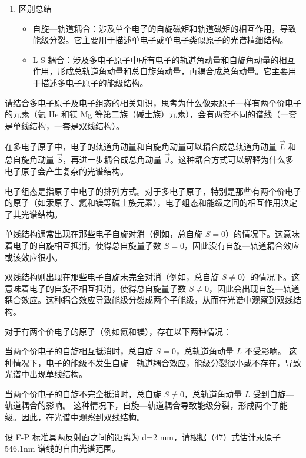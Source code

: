 \documentclass[dvipsnames, svgnames,a4paper,11pt]{article}
\begin{document}
\begin{enumerate}
		\item 区别总结
		
		\begin{itemize}
			\item 自旋—轨道耦合：涉及单个电子的自旋磁矩和轨道磁矩的相互作用，导致能级分裂。它主要用于描述单电子或单电子类似原子的光谱精细结构。
			\item L-S 耦合：涉及多电子原子中所有电子的轨道角动量和自旋角动量的相互作用，形成总轨道角动量和总自旋角动量，再耦合成总角动量。它主要用于描述多电子原子的能级结构。
		\end{itemize}
	\end{enumerate}
	
	
	\begin{question}
		请结合多电子原子及电子组态的相关知识，思考为什么像汞原子一样有两个价电子的元素（氦 He 和镁 Mg 等第二族（碱土族）元素），会有两套不同的谱线（一套是单线结构，一套是双线结构）。
	\end{question}
	
	在多电子原子中，电子的轨道角动量和自旋角动量可以耦合成总轨道角动量 \( \vec{L} \) 和总自旋角动量 \( \vec{S} \)，再进一步耦合成总角动量 \( \vec{J} \)。这种耦合方式可以解释为什么多电子原子会产生复杂的光谱结构。
	
	电子组态是指原子中电子的排列方式。对于多电子原子，特别是那些有两个价电子的原子（如汞原子、氦和镁等碱土族元素），电子组态和能级之间的相互作用决定了其光谱结构。
	
	单线结构通常出现在那些电子自旋对消（例如，总自旋 \( S = 0 \)）的情况下。这意味着电子的自旋相互抵消，使得总自旋量子数 \( S = 0 \)，因此没有自旋—轨道耦合效应或该效应很小。
	
	双线结构则出现在那些电子自旋未完全对消（例如，总自旋 \( S \neq 0 \)）的情况下。这意味着电子的自旋不相互抵消，使得总自旋量子数 \( S \neq 0 \)，因此会出现自旋—轨道耦合效应。这种耦合效应导致能级分裂成两个子能级，从而在光谱中观察到双线结构。
	
	对于有两个价电子的原子（例如氦和镁），存在以下两种情况：
	
	当两个价电子的自旋相互抵消时，总自旋 \( S = 0 \)，总轨道角动量 \( L \) 不受影响。
	这种情况下，电子的能级不发生自旋—轨道耦合效应，能级分裂很小或不存在，导致光谱中出现单线结构。
	
	当两个价电子的自旋不完全抵消时，总自旋 \( S \neq 0 \)，总轨道角动量 \( L \) 受到自旋—轨道耦合的影响。
	这种情况下，自旋—轨道耦合导致能级分裂，形成两个子能级。因此，在光谱中观察到双线结构。	
	
	\begin{question}
		设 F-P 标准具两反射面之间的距离为 d=2 mm，请根据（47）式估计汞原子 546.1nm 谱线的自由光谱范围。
	\end{question}
	
\end{document}
